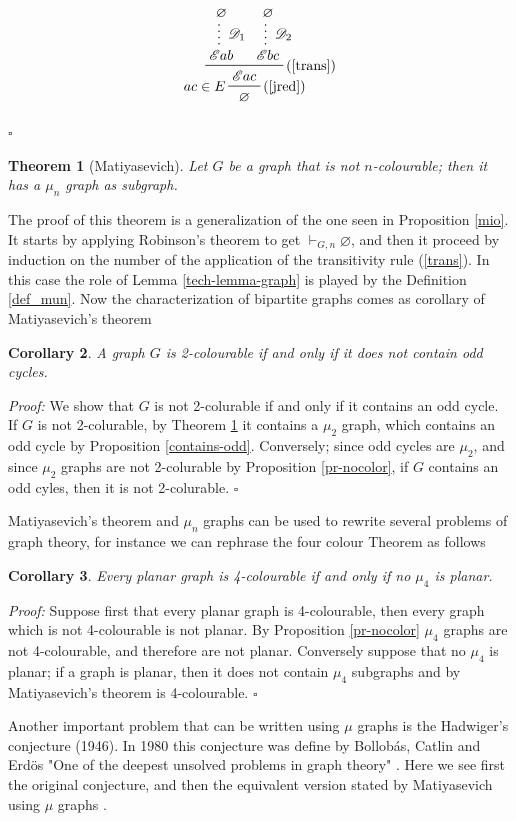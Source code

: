 \documentclass[a4paper,12pt,oneside]{book}
\newtheorem{theorem}{Theorem}[chapter]
\newtheorem{corollary}[theorem]{Corollary}
\newcommand{\E}{\mathscr{E}}
\newcommand{\D}{\mathscr{D}}
\newcommand*{\QED}{\hfill\ensuremath{\square}}
\let\emptyset\varnothing
\begin{document}
\begin{equation*}
\prftree[l,r]{(\ref{jred})} {$ac\in E$}
{  \prftree[r]{(\ref{trans})}  
{  \prfsummary[$\D_1$]{\emptyset}{\E ab } }{ \prfsummary[$\D_2$]{\emptyset}{\E bc  }} 
 {\E ac } } 
{\emptyset}
\end{equation*}

\QED


\begin{theorem}[Matiyasevich]\label{mati-thm}
Let $G$ be a graph that is not $n$-colourable; then it has a $\mu_n$ graph as subgraph.
\end{theorem}
The proof of this theorem is a generalization of the one seen in Proposition \ref{mio}. It starts by applying Robinson's theorem to get $\vdash_{G,n}\emptyset$, and then it proceed by induction on the number of the application of the transitivity rule (\ref{trans}). In this case the role of Lemma \ref{tech-lemma-graph} is played by the Definition \ref{def_mun}. Now the characterization of bipartite graphs comes as corollary of Matiyasevich's theorem

\begin{corollary}
A graph $G$ is 2-colourable if and only if it does not contain odd cycles.
\end{corollary}
\textit{Proof:}
We show that $G$ is not 2-colurable if and only if it contains an odd cycle.
If $G$ is not 2-colurable, by Theorem \ref{mati-thm} it contains a $\mu_2$ graph, which contains an odd cycle by Proposition \ref{contains-odd}. Conversely; since odd cycles are $\mu_2$, and since $\mu_2$ graphs are not 2-colurable by Proposition \ref{pr-nocolor}, if $G$  contains an odd cyles, then it is not 2-colurable. \QED

Matiyasevich's theorem and $\mu_n$ graphs can be used to rewrite several problems of graph theory, for instance we can rephrase the four colour Theorem as follows

\begin{corollary}\label{cor-4}
Every planar graph is 4-colourable if and only if no $\mu_4$ is planar.
\end{corollary}
\textit{Proof:}
Suppose first that every planar graph is 4-colourable, then every graph which is not 4-colourable is not planar. By Proposition \ref{pr-nocolor} $\mu_4$ graphs are not 4-colourable, and therefore are not planar.
Conversely suppose that no $\mu_4$ is planar; if a graph is planar, then it does not contain $\mu_4$ subgraphs and by Matiyasevich's theorem is 4-colourable.
\QED

\newpage
Another important problem that can be written using $\mu$ graphs is the Hadwiger's conjecture (1946)\cite{hadwiger}. In 1980 this conjecture was define by Bollobás, Catlin and  Erd\"os  "One of the deepest unsolved problems in graph theory" \cite{erdos}. Here we see first the original conjecture, and then the equivalent version stated by Matiyasevich using $\mu$ graphs \cite{mat-2}.
\end{document}
